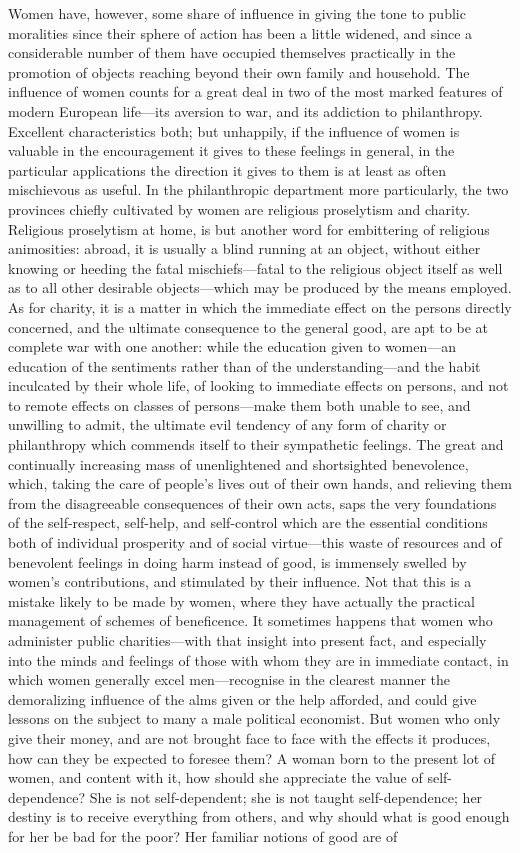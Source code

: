 \documentclass[12pt]{report}
\begin{document}
Women have, however, some share of influence in giving the tone to public moralities since their sphere of action has been a little widened, and since a considerable number of them have occupied themselves practically in the promotion of objects reaching beyond their own family and household. The influence of women counts for a great deal in two of the most marked features of modern European life—its aversion to war, and its addiction to philanthropy. Excellent characteristics both; but unhappily, if the influence of women is valuable in the encouragement it gives to these feelings in general, in the particular applications the direction it gives to them is at least as often mischievous as useful. In the philanthropic department more particularly, the two provinces chiefly cultivated by women are religious proselytism and charity. Religious proselytism at home, is but another word for embittering of religious animosities: abroad, it is usually a blind running at an object, without either knowing or heeding the fatal mischiefs—fatal to the religious object itself as well as to all other desirable objects—which may be produced by the means employed. As for charity, it is a matter in which the immediate effect on the persons directly concerned, and the ultimate consequence to the general good, are apt to be at complete war with one another: while the education given to women—an education of the sentiments rather than of the understanding—and the habit inculcated by their whole life, of looking to immediate effects on persons, and not to remote effects on classes of persons—make them both unable to see, and unwilling to admit, the ultimate evil tendency of any form of charity or philanthropy which commends itself to their sympathetic feelings. The great and continually increasing mass of unenlightened and shortsighted benevolence, which, taking the care of people's lives out of their own hands, and relieving them from the disagreeable consequences of their own acts, saps the very foundations of the self-respect, self-help, and self-control which are the essential conditions both of individual prosperity and of social virtue—this waste of resources and of benevolent feelings in doing harm instead of good, is immensely swelled by women's contributions, and stimulated by their influence. Not that this is a mistake likely to be made by women, where they have actually the practical management of schemes of beneficence. It sometimes happens that women who administer public charities—with that insight into present fact, and especially into the minds and feelings of those with whom they are in immediate contact, in which women generally excel men—recognise in the clearest manner the demoralizing influence of the alms given or the help afforded, and could give lessons on the subject to many a male political economist. But women who only give their money, and are not brought face to face with the effects it produces, how can they be expected to foresee them? A woman born to the present lot of women, and content with it, how should she appreciate the value of self-dependence? She is not self-dependent; she is not taught self-dependence; her destiny is to receive everything from others, and why should what is good enough for her be bad for the poor? Her familiar notions of good are of 
\end{document}
